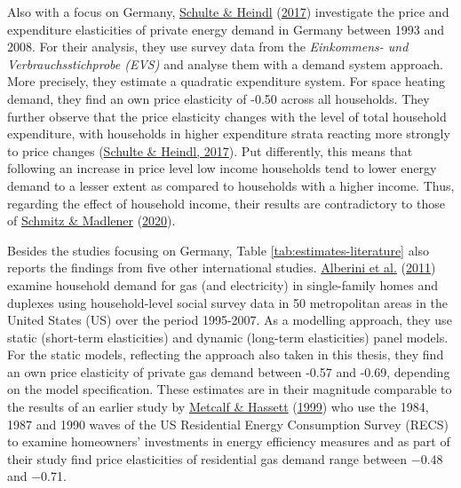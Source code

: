 \documentclass[12pt,twoside]{reedthesis}
\begin{document}
Also with a focus on Germany, \protect\hyperlink{ref-schulte_heindl17}{Schulte \& Heindl} (\protect\hyperlink{ref-schulte_heindl17}{2017}) investigate the price and expenditure elasticities of private energy demand in Germany between 1993 and 2008. For their analysis, they use survey data from the \emph{Einkommens- und Verbrauchsstichprobe (EVS)} and analyse them with a demand system approach. More precisely, they estimate a quadratic expenditure system. For space heating demand, they find an own price elasticity of -0.50 across all households. They further observe that the price elasticity changes with the level of total household expenditure, with households in higher expenditure strata reacting more strongly to price changes (\protect\hyperlink{ref-schulte_heindl17}{Schulte \& Heindl, 2017}). Put differently, this means that following an increase in price level low income households tend to lower energy demand to a lesser extent as compared to households with a higher income. Thus, regarding the effect of household income, their results are contradictory to those of \protect\hyperlink{ref-schmitz_madlener20}{Schmitz \& Madlener} (\protect\hyperlink{ref-schmitz_madlener20}{2020}).

Besides the studies focusing on Germany, Table \ref{tab:estimates-literature} also reports the findings from five other international studies. \protect\hyperlink{ref-alberini_etal11}{Alberini et al.} (\protect\hyperlink{ref-alberini_etal11}{2011}) examine household demand for gas (and electricity) in single-family homes and duplexes using household-level social survey data in 50 metropolitan areas in the United States (US) over the period 1995-2007. As a modelling approach, they use static (short-term elasticities) and dynamic (long-term elasticities) panel models. For the static models, reflecting the approach also taken in this thesis, they find an own price elasticity of private gas demand between -0.57 and -0.69, depending on the model specification. These estimates are in their magnitude comparable to the results of an earlier study by \protect\hyperlink{ref-metcalf_hassett99}{Metcalf \& Hassett} (\protect\hyperlink{ref-metcalf_hassett99}{1999}) who use the 1984, 1987 and 1990 waves of the US Residential Energy Consumption Survey (RECS) to examine homeowners' investments in energy efficiency measures and as part of their study find price elasticities of residential gas demand range between −0.48 and −0.71.
\end{document}
